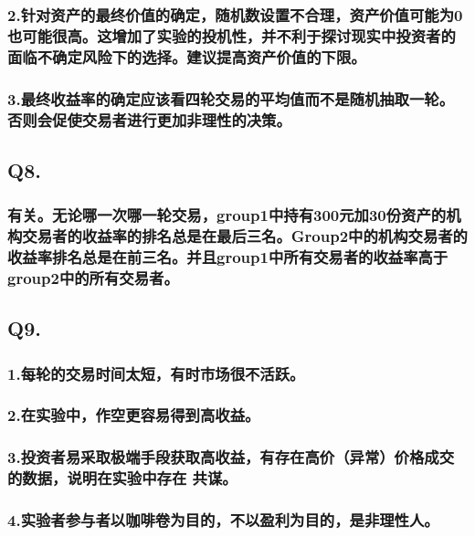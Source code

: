 \documentclass[]{article}
\begin{document}
\subsubsection{2.针对资产的最终价值的确定，随机数设置不合理，资产价值可能为0也可能很高。这增加了实验的投机性，并不利于探讨现实中投资者的面临不确定风险下的选择。建议提高资产价值的下限。}\label{0}

\subsubsection{3.最终收益率的确定应该看四轮交易的平均值而不是随机抽取一轮。否则会促使交易者进行更加非理性的决策。}

\subsection{Q8.}\label{q8.}

\subsubsection{有关。无论哪一次哪一轮交易，group1中持有300元加30份资产的机构交易者的收益率的排名总是在最后三名。Group2中的机构交易者的收益率排名总是在前三名。并且group1中所有交易者的收益率高于group2中的所有交易者。}\label{group130030group2group1group2}

\subsection{Q9.}\label{q9.}

\subsubsection{1.每轮的交易时间太短，有时市场很不活跃。}

\subsubsection{2.在实验中，作空更容易得到高收益。}

\subsubsection{3.投资者易采取极端手段获取高收益，有存在高价（异常）价格成交的数据，说明在实验中存在
共谋。}\label{-}

\subsubsection{4.实验者参与者以咖啡卷为目的，不以盈利为目的，是非理性人。}
\end{document}
